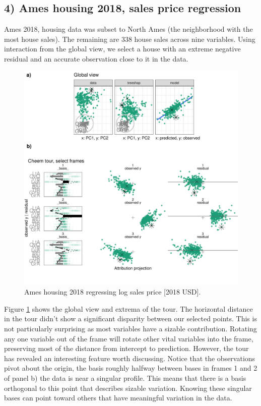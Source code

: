 \documentclass[
  article]{article}
\begin{document}
\hypertarget{ames-housing-2018-sales-price-regression}{%
\subsection{4) Ames housing 2018, sales price regression}\label{ames-housing-2018-sales-price-regression}}

Ames 2018, housing data was subset to North Ames (the neighborhood with the most house sales). The remaining are 338 house sales across nine variables. Using interaction from the global view, we select a house with an extreme negative residual and an accurate observation close to it in the data.

\begin{figure}

{\centering \includegraphics[width=1\linewidth]{./figures/case_ames2018} 

}

\caption{Ames housing 2018 regressing log sales price [2018 USD].}\label{fig:caseames}
\end{figure}

Figure \ref{fig:caseames} shows the global view and extrema of the tour. The horizontal distance in the tour didn't show a significant disparity between our selected points. This is not particularly surprising as most variables have a sizable contribution. Rotating any one variable out of the frame will rotate other vital variables into the frame, preserving most of the distance from intercept to prediction. However, the tour has revealed an interesting feature worth discussing. Notice that the observations pivot about the origin, the basis roughly halfway between bases in frames 1 and 2 of panel b) the data is near a singular profile. This means that there is a basis orthogonal to this point that describes sizable variation. Knowing these singular bases can point toward others that have meaningful variation in the data.
\end{document}
